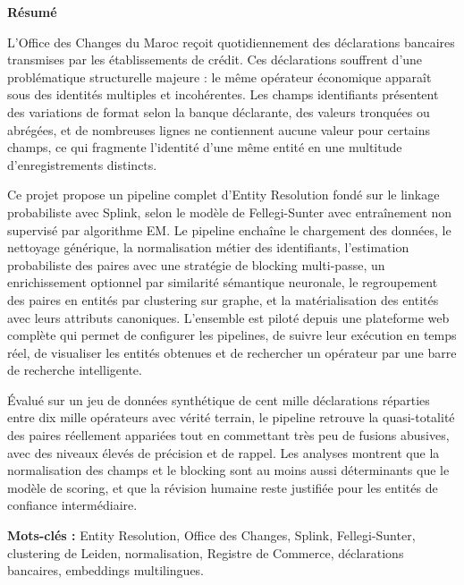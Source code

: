 

\begin{center}
    \begin{minipage}{0.9\textwidth}
        \centering
        \textbf{Résumé}

        \medskip
        \begin{justify}
L'Office des Changes du Maroc reçoit quotidiennement des déclarations bancaires transmises par les établissements de crédit. Ces déclarations souffrent d'une problématique structurelle majeure : le même opérateur économique apparaît sous des identités multiples et incohérentes. Les champs identifiants présentent des variations de format selon la banque déclarante, des valeurs tronquées ou abrégées, et de nombreuses lignes ne contiennent aucune valeur pour certains champs, ce qui fragmente l'identité d'une même entité en une multitude d'enregistrements distincts.

Ce projet propose un pipeline complet d'Entity Resolution fondé sur le linkage probabiliste avec Splink, selon le modèle de Fellegi-Sunter avec entraînement non supervisé par algorithme EM. Le pipeline enchaîne le chargement des données, le nettoyage générique, la normalisation métier des identifiants, l'estimation probabiliste des paires avec une stratégie de blocking multi-passe, un enrichissement optionnel par similarité sémantique neuronale, le regroupement des paires en entités par clustering sur graphe, et la matérialisation des entités avec leurs attributs canoniques. L'ensemble est piloté depuis une plateforme web complète qui permet de configurer les pipelines, de suivre leur exécution en temps réel, de visualiser les entités obtenues et de rechercher un opérateur par une barre de recherche intelligente.

Évalué sur un jeu de données synthétique de cent mille déclarations réparties entre dix mille opérateurs avec vérité terrain, le pipeline retrouve la quasi-totalité des paires réellement appariées tout en commettant très peu de fusions abusives, avec des niveaux élevés de précision et de rappel. Les analyses montrent que la normalisation des champs et le blocking sont au moins aussi déterminants que le modèle de scoring, et que la révision humaine reste justifiée pour les entités de confiance intermédiaire.
        \end{justify}

        \bigskip
        \textbf{Mots-clés :} Entity Resolution, Office des Changes, Splink, Fellegi-Sunter, clustering de Leiden, normalisation, Registre de Commerce, déclarations bancaires, embeddings multilingues.
    \end{minipage}
\end{center}

